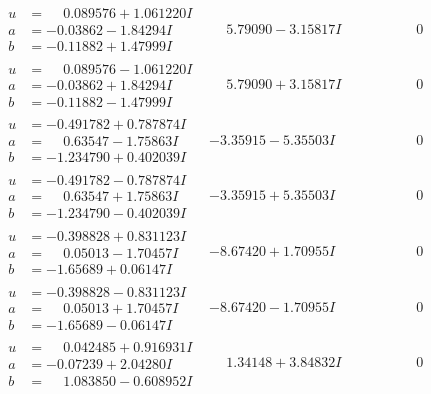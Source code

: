 \documentclass[1p]{elsarticle_modified}
\theoremstyle{definition}
\begin{document}
$$\begin{array}{c|c|c}
\begin{aligned}
u &= \phantom{-}0.089576 + 1.061220 I \\
a &= -0.03862 - 1.84294 I \\
b &= -0.11882 + 1.47999 I\end{aligned}
 & \phantom{-}5.79090 - 3.15817 I & \phantom{-0.000000 } 0 \\ \hline\begin{aligned}
u &= \phantom{-}0.089576 - 1.061220 I \\
a &= -0.03862 + 1.84294 I \\
b &= -0.11882 - 1.47999 I\end{aligned}
 & \phantom{-}5.79090 + 3.15817 I & \phantom{-0.000000 } 0 \\ \hline\begin{aligned}
u &= -0.491782 + 0.787874 I \\
a &= \phantom{-}0.63547 - 1.75863 I \\
b &= -1.234790 + 0.402039 I\end{aligned}
 & -3.35915 - 5.35503 I & \phantom{-0.000000 } 0 \\ \hline\begin{aligned}
u &= -0.491782 - 0.787874 I \\
a &= \phantom{-}0.63547 + 1.75863 I \\
b &= -1.234790 - 0.402039 I\end{aligned}
 & -3.35915 + 5.35503 I & \phantom{-0.000000 } 0 \\ \hline\begin{aligned}
u &= -0.398828 + 0.831123 I \\
a &= \phantom{-}0.05013 - 1.70457 I \\
b &= -1.65689 + 0.06147 I\end{aligned}
 & -8.67420 + 1.70955 I & \phantom{-0.000000 } 0 \\ \hline\begin{aligned}
u &= -0.398828 - 0.831123 I \\
a &= \phantom{-}0.05013 + 1.70457 I \\
b &= -1.65689 - 0.06147 I\end{aligned}
 & -8.67420 - 1.70955 I & \phantom{-0.000000 } 0 \\ \hline\begin{aligned}
u &= \phantom{-}0.042485 + 0.916931 I \\
a &= -0.07239 + 2.04280 I \\
b &= \phantom{-}1.083850 - 0.608952 I\end{aligned}
 & \phantom{-}1.34148 + 3.84832 I & \phantom{-0.000000 } 0 \\ \hline\begin{aligned}

\end{aligned}
\end{array}$$
\end{document}
